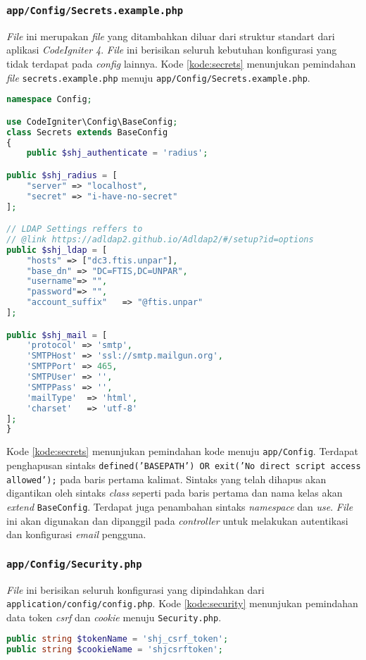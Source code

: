 \subsubsection{\texttt{app/Config/Secrets.example.php}}
\textit{File} ini merupakan \textit{file} yang ditambahkan diluar dari struktur standart dari aplikasi \textit{CodeIgniter 4}. \textit{File} ini berisikan seluruh kebutuhan konfigurasi yang tidak terdapat pada \textit{config} lainnya. Kode \ref{kode:secrets} menunjukan pemindahan \textit{file} \texttt{secrets.example.php} menuju \texttt{app/Config/Secrets.example.php}.
\begin{lstlisting}[language=PHP, caption=Penambahan \textit{file} \texttt{Secrets.example.php}, label=kode:secrets]
namespace Config;

use CodeIgniter\Config\BaseConfig;
class Secrets extends BaseConfig
{ 
	public $shj_authenticate = 'radius';

public $shj_radius = [
    "server" => "localhost",
    "secret" => "i-have-no-secret"
];

// LDAP Settings reffers to
// @link https://adldap2.github.io/Adldap2/#/setup?id=options
public $shj_ldap = [
    "hosts" => ["dc3.ftis.unpar"],
    "base_dn" => "DC=FTIS,DC=UNPAR",
    "username"=> "",
    "password"=> "",
    "account_suffix"   => "@ftis.unpar"
];

public $shj_mail = [
    'protocol' => 'smtp',
    'SMTPHost' => 'ssl://smtp.mailgun.org',
    'SMTPPort' => 465,
    'SMTPUser' => '',
    'SMTPPass' => '',
    'mailType'  => 'html',
    'charset'   => 'utf-8'
];
}
\end{lstlisting}

Kode \ref{kode:secrets} menunjukan pemindahan kode menuju \texttt{app/Config}. Terdapat penghapusan sintaks \texttt{defined('BASEPATH') OR exit('No direct script access allowed');} pada baris pertama kalimat. Sintaks yang telah dihapus akan digantikan oleh sintaks \textit{class} seperti pada baris pertama dan nama kelas akan \textit{extend} \texttt{BaseConfig}. Terdapat juga penambahan sintaks \textit{namespace} dan \textit{use}. \textit{File} ini akan digunakan dan dipanggil pada \textit{controller} untuk melakukan autentikasi dan konfigurasi \textit{email} pengguna.

\subsubsection{\texttt{app/Config/Security.php}}
\textit{File} ini berisikan seluruh konfigurasi yang dipindahkan dari \texttt{application/config/config.php}. Kode \ref{kode:security} menunjukan pemindahan data token \textit{csrf} dan \textit{cookie} menuju \texttt{Security.php}.
\begin{lstlisting}[language=PHP, caption=Pemindahan \textit{file} \textit{config} menuju \texttt{Security.php}, label=kode:security]
public string $tokenName = 'shj_csrf_token';
public string $cookieName = 'shjcsrftoken';
\end{lstlisting}

